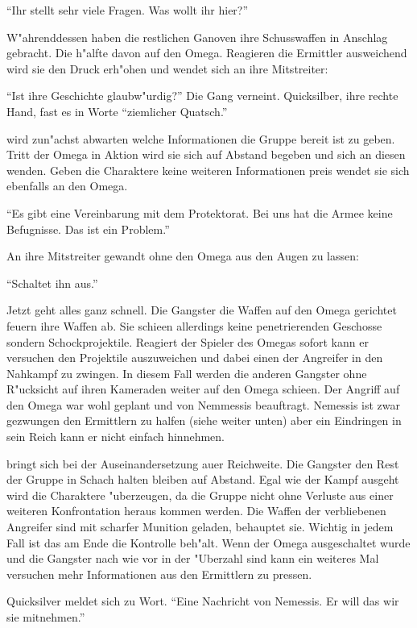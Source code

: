 "`Ihr stellt sehr viele Fragen. Was wollt ihr hier?"'

W"ahrenddessen haben die restlichen Ganoven ihre Schusswaffen in Anschlag gebracht. Die h"alfte davon auf den Omega. Reagieren die Ermittler ausweichend wird sie den Druck erh"ohen und wendet sich an ihre Mitstreiter:

"`Ist ihre Geschichte glaubw"urdig?"' Die Gang verneint. Quicksilber, ihre rechte Hand, fast es in Worte "`ziemlicher Quatsch."'

\xlsn{} wird zun"achst abwarten welche Informationen die Gruppe bereit ist zu geben. Tritt der Omega in Aktion wird sie sich auf Abstand begeben und sich an diesen wenden. Geben die Charaktere keine weiteren Informationen preis wendet sie sich ebenfalls an den Omega.

"`Es gibt eine Vereinbarung mit dem Protektorat. Bei uns hat die Armee keine Befugnisse. Das ist ein Problem."' 

An ihre Mitstreiter gewandt ohne den Omega aus den Augen zu lassen:

"`Schaltet ihn aus."'

Jetzt geht alles ganz schnell. Die Gangster die Waffen auf den Omega gerichtet feuern ihre Waffen ab. Sie schie\3en allerdings keine penetrierenden Geschosse sondern Schockprojektile. Reagiert der Spieler des Omegas sofort kann er versuchen den Projektile auszuweichen und dabei einen der Angreifer in den Nahkampf zu zwingen. In diesem Fall werden die anderen Gangster ohne R"ucksicht auf ihren Kameraden weiter auf den Omega schie\3en. Der Angriff auf den Omega war wohl geplant und von Nemmessis beauftragt. Nemessis ist zwar gezwungen den Ermittlern zu halfen (siehe weiter unten) aber ein Eindringen in sein Reich kann er nicht einfach hinnehmen. 

\xlsn{} bringt sich bei der Auseinandersetzung au\3er Reichweite. Die Gangster den Rest der Gruppe in Schach halten bleiben auf Abstand. Egal wie der Kampf ausgeht wird \xlsn{} die Charaktere "uberzeugen, da\3 die Gruppe nicht ohne Verluste aus einer weiteren Konfrontation heraus kommen werden. Die Waffen der verbliebenen Angreifer sind mit scharfer Munition geladen, behauptet sie. Wichtig in jedem Fall ist das \xlsn{} am Ende die Kontrolle beh"alt. Wenn der Omega ausgeschaltet wurde und die Gangster nach wie vor in der "Uberzahl sind kann \xlsn{} ein weiteres Mal versuchen mehr Informationen aus den Ermittlern zu pressen.

Quicksilver meldet sich zu Wort. "`Eine Nachricht von Nemessis. Er will das wir sie mitnehmen."'

